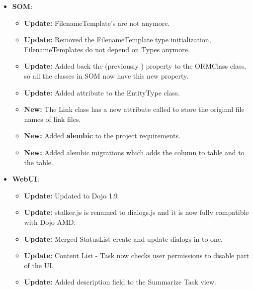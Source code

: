 \documentclass[a4paper,10pt,english]{sphinxmanual}
\begin{document}
\label{changelog:b3}\begin{itemize}
\item {} 
\textbf{SOM}:
\begin{itemize}
\item {} 
\textbf{Update:} FilenameTemplate's are not  anymore.

\item {} 
\textbf{Update:} Removed the FilenameTemplate type initialization, FilenameTemplates
do not depend on Types anymore.

\item {} 
\textbf{Update:} Added back the  (previously )
property to the ORMClass class, so all the classes in SOM now have this new
property.

\item {} 
\textbf{Update:} Added  attribute to the EntityType class.

\item {} 
\textbf{New:} The Link class has a new attribute called  to
store the original file names of link files.

\item {} 
\textbf{New:} Added \textbf{alembic} to the project requirements.

\item {} 
\textbf{New:} Added alembic migrations which adds the  column
to  table and  to the  table.

\end{itemize}

\item {} 
\textbf{WebUI}:
\begin{itemize}
\item {} 
\textbf{Update:} Updated to Dojo 1.9

\item {} 
\textbf{Update:} stalker.js is renamed to dialogs.js and it is now fully compatible
with Dojo AMD.

\item {} 
\textbf{Update:} Merged StatusList create and update dialogs in to one.

\item {} 
\textbf{Update:} Content List - Task now checks user permissions to disable part of
the UI.

\item {} 
\textbf{Update:} Added description field to the Summarize Task view.


\end{itemize}
\end{itemize}
\end{document}
